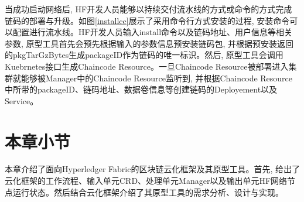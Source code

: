 当成功启动网络后, HF开发人员能够以持续交付流水线的方式或命令的方式完成链码的部署与升级。如图\ref{installcc}展示了采用命令行方式安装的过程, 安装命令可以配置进行流水线。HF开发人员输入install命令以及链码地址、用户信息等相关参数, 原型工具首先会预先根据输入的参数信息预安装链码包, 并根据预安装返回的pkgTarGzBytes生成packageID作为链码的唯一标识。然后, 原型工具会调用Kuebrnetes接口生成Chaincode Resource。一旦Chaincode Resource被部署进入集群就能够被Manager中的Chaincode Resource监听到, 并根据Chaincode Resource中所带的packageID、链码地址、数据卷信息等创建链码的Deployement以及Service。

\section{本章小节}

本章介绍了面向Hyperledger Fabric的区块链云化框架及其原型工具。首先, 给出了云化框架的工作流程、输入单元CRD、处理单元Manager以及输出单元HF网络节点运行状态。然后结合云化框架介绍了其原型工具的需求分析、设计与实现。











